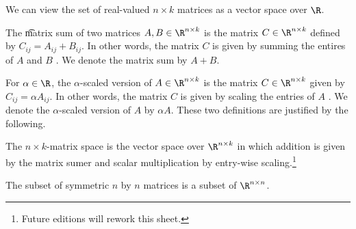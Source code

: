 

We can view the set of real-valued $n \times k$ matrices as a vector space over $\R$.


The \t{matrix sum} of two matrices $A, B \in \R^{n \times k}$ is the matrix $C \in \R^{n \times k}$ defined by $C_{ij} = A_{ij} + B_{ij}$.
In other words, the matrix $C$ is given by summing the entires of $A$ and $B$ .
We denote the matrix sum by $A + B$.

For $\alpha \in \R$, the \t{$\alpha$-scaled version} of $A \in \R^{n \times k}$ is the matrix $C \in \R^{n \times k}$ given by $C_{ij} = \alpha A_{ij}$.
In other words, the matrix $C$ is given by scaling the entries of $A$ .
We denote the $\alpha$-scaled version of $A$ by $\alpha A$.
These two definitions are justified by the following.

The \t{$n \times k$-matrix space} is the vector space over $\R^{n \times k}$ in which addition is given by the matrix sumer and scalar multiplication by entry-wise scaling.\footnote{Future editions will rework this sheet.}



The subset of symmetric $n$ by $n$ matrices is a subset of $\R^{n \times n}$.
\blankpage
